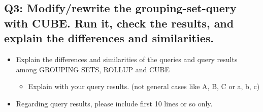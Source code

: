 \documentclass[]{article}
\begin{document}
\subsection*{Q3: Modify/rewrite the grouping-set-query with CUBE. Run it, check the results, and explain the differences and similarities.}

\begin{itemize}
	\item Explain the differences and similarities of the queries and query results among GROUPING SETS, ROLLUP and CUBE
	\begin{itemize}
		\item Explain with your query results. (not general cases like A, B, C or a, b, c)
	\end{itemize}
	\item Regarding query results, please include first 10 lines or so only.
\end{itemize}
\end{document}
